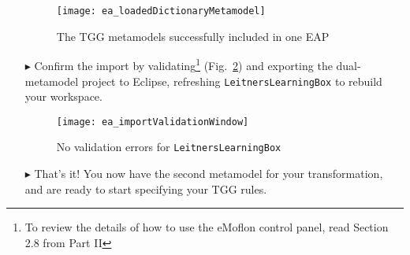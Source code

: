 \begin{itemize}
\begin{figure}[htbp]
\begin{center}
  \texttt{[image: ea\_loadedDictionaryMetamodel]}
  \caption{The TGG metamodels successfully included in one EAP}
  \label{ea:importProBrowser}
\end{center}
\end{figure}

\clearpage

\item[$\blacktriangleright$] Confirm the import by validating\footnote{To review the details of how to use the eMoflon control panel, read Section 2.8 from
Part II} (Fig.~\ref{ea:importValidationWindow}) and exporting the dual-metamodel project to Eclipse, refreshing \texttt{LeitnersLearningBox} to rebuild your workspace. 

\vspace{0.5cm}

\begin{figure}[htbp]
\begin{center}
  \texttt{[image: ea\_importValidationWindow]}
  \caption{No validation errors for \texttt{LeitnersLearningBox}}
  \label{ea:importValidationWindow}
\end{center}
\end{figure}

\vspace{0.5cm}

\item[$\blacktriangleright$] That's it! You now have the second metamodel for your transformation, and are ready to start specifying your TGG rules.


\end{itemize}
